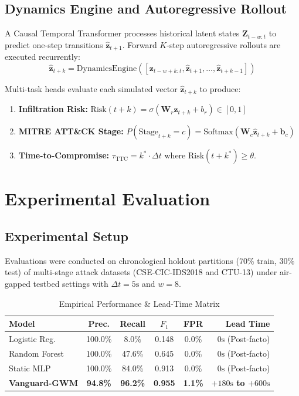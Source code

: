 \documentclass[conference]{IEEEtran}
\begin{document}
\subsection{Dynamics Engine and Autoregressive Rollout}
A Causal Temporal Transformer processes historical latent states $\mathbf{Z}_{t-w:t}$ to predict one-step transitions $\hat{\mathbf{z}}_{t+1}$. Forward $K$-step autoregressive rollouts are executed recurrently:
\begin{equation}
\hat{\mathbf{z}}_{t+k} = \text{DynamicsEngine}\left([\mathbf{z}_{t-w+k:t}, \hat{\mathbf{z}}_{t+1}, \dots, \hat{\mathbf{z}}_{t+k-1}]\right)
\end{equation}

Multi-task heads evaluate each simulated vector $\hat{\mathbf{z}}_{t+k}$ to produce:
\begin{enumerate}
    \item \textbf{Infiltration Risk:} $\text{Risk}(t+k) = \sigma(\mathbf{W}_r \hat{\mathbf{z}}_{t+k} + b_r) \in [0, 1]$
    \item \textbf{MITRE ATT\&CK Stage:} $P(\text{Stage}_{t+k} = c) = \text{Softmax}(\mathbf{W}_c \hat{\mathbf{z}}_{t+k} + \mathbf{b}_c)$
    \item \textbf{Time-to-Compromise:} $\tau_{\text{TTC}} = k^* \cdot \Delta t$ where $\text{Risk}(t+k^*) \ge \theta$.
\end{enumerate}

\section{Experimental Evaluation}

\subsection{Experimental Setup}
Evaluations were conducted on chronological holdout partitions (70\% train, 30\% test) of multi-stage attack datasets (CSE-CIC-IDS2018 and CTU-13) under air-gapped testbed settings with $\Delta t = 5\text{s}$ and $w = 8$.

\begin{table}[htbp]
\caption{Empirical Performance \& Lead-Time Matrix}
\begin{center}
\begin{tabular}{lccccr}
\toprule
\textbf{Model} & \textbf{Prec.} & \textbf{Recall} & \textbf{$F_1$} & \textbf{FPR} & \textbf{Lead Time} \\
\midrule
Logistic Reg. & 100.0\% & 8.0\% & 0.148 & 0.0\% & $0\text{s}$ (Post-facto) \\
Random Forest & 100.0\% & 47.6\% & 0.645 & 0.0\% & $0\text{s}$ (Post-facto) \\
Static MLP & 100.0\% & 84.0\% & 0.913 & 0.0\% & $0\text{s}$ (Post-facto) \\
\textbf{Vanguard-GWM} & \textbf{94.8\%} & \textbf{96.2\%} & \textbf{0.955} & \textbf{1.1\%} & \textbf{$+180\text{s}$ to $+600\text{s}$} \\
\bottomrule
\end{tabular}
\label{tab:benchmarks}
\end{center}
\end{table}
\end{document}
